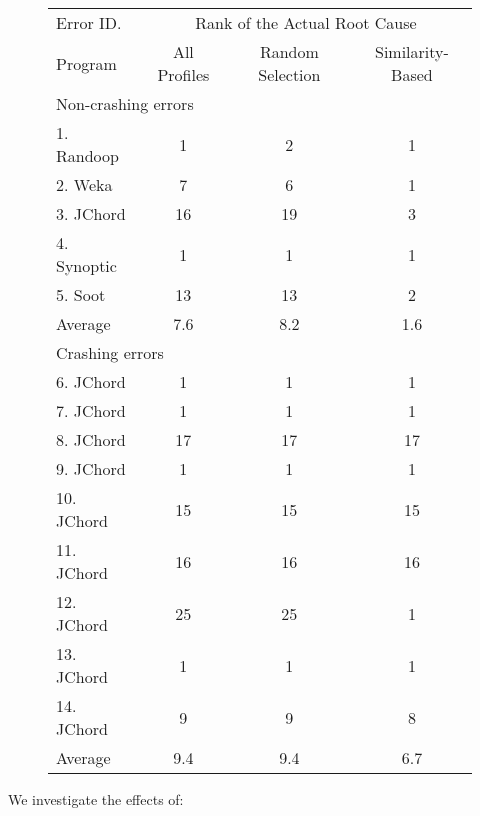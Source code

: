 \begin{figure}[t]
\vspace{1mm}
\setlength{\tabcolsep}{.74\tabcolsep}
\small{
\begin{tabular}{|l|c|c||c|}
\hline
 Error ID. & \multicolumn{3}{|c|}{Rank of the Actual Root Cause} \\
\cline{2-4}
 Program & All Profiles& Random Selection&  Similarity-Based\\
 \hline
\hline
\multicolumn{4}{|l|}{Non-crashing errors}   \\
 \hline
 1. Randoop & 1 & 2 & 1\\
 2. Weka & 7 & 6 & 1\\
 3. JChord & 16 & 19 & 3\\
 4. Synoptic & 1 & 1 & 1\\
 5. Soot & 13 & 13 & 2\\
\hline
Average & 7.6 & 8.2 & 1.6 \\
\hline
\hline
\multicolumn{4}{|l|}{Crashing errors}   \\
\hline
 6. JChord & 1 & 1 &1\\
 7. JChord & 1 & 1 &1\\
 8. JChord & 17 & 17 &17\\
 9. JChord & 1 &  1&1\\
 10. JChord & 15 & 15 &15\\
 11. JChord & 16 & 16 &16\\
 12. JChord & 25 & 25 &1\\
 13. JChord & 1 & 1 &1\\
 14. JChord & 9 & 9 &8\\
\hline
Average & 9.4 & 9.4 & 6.7\\
\hline
\end{tabular}
}
\vspace{-3mm}
\end{figure}

We investigate the effects of:

